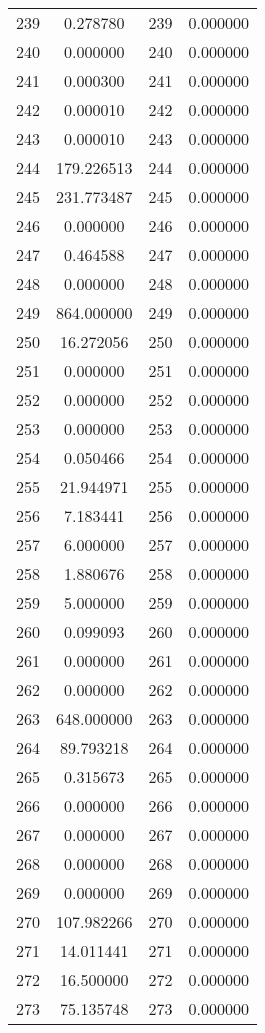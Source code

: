 \documentclass[12pt]{article}
\begin{document}
\begin{longtable}{@{}cccc@{}}
239 & 0.278780 & 239 & 0.000000 \\
240 & 0.000000 & 240 & 0.000000 \\
241 & 0.000300 & 241 & 0.000000 \\
242 & 0.000010 & 242 & 0.000000 \\
243 & 0.000010 & 243 & 0.000000 \\
244 & 179.226513 & 244 & 0.000000 \\
245 & 231.773487 & 245 & 0.000000 \\
246 & 0.000000 & 246 & 0.000000 \\
247 & 0.464588 & 247 & 0.000000 \\
248 & 0.000000 & 248 & 0.000000 \\
249 & 864.000000 & 249 & 0.000000 \\
250 & 16.272056 & 250 & 0.000000 \\
251 & 0.000000 & 251 & 0.000000 \\
252 & 0.000000 & 252 & 0.000000 \\
253 & 0.000000 & 253 & 0.000000 \\
254 & 0.050466 & 254 & 0.000000 \\
255 & 21.944971 & 255 & 0.000000 \\
256 & 7.183441 & 256 & 0.000000 \\
257 & 6.000000 & 257 & 0.000000 \\
258 & 1.880676 & 258 & 0.000000 \\
259 & 5.000000 & 259 & 0.000000 \\
260 & 0.099093 & 260 & 0.000000 \\
261 & 0.000000 & 261 & 0.000000 \\
262 & 0.000000 & 262 & 0.000000 \\
263 & 648.000000 & 263 & 0.000000 \\
264 & 89.793218 & 264 & 0.000000 \\
265 & 0.315673 & 265 & 0.000000 \\
266 & 0.000000 & 266 & 0.000000 \\
267 & 0.000000 & 267 & 0.000000 \\
268 & 0.000000 & 268 & 0.000000 \\
269 & 0.000000 & 269 & 0.000000 \\
270 & 107.982266 & 270 & 0.000000 \\
271 & 14.011441 & 271 & 0.000000 \\
272 & 16.500000 & 272 & 0.000000 \\
273 & 75.135748 & 273 & 0.000000 \\

\end{longtable}
\end{document}
